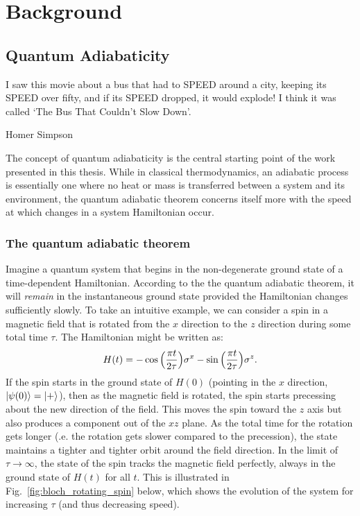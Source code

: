 \part{Background}
\chapter{Quantum Adiabaticity}

\epigraph{I saw this movie about a bus that had to SPEED around a city, keeping its SPEED over fifty, and if its SPEED dropped, it would explode! I think it was called `The Bus That Couldn’t Slow Down'.}{Homer Simpson}

    
The concept of quantum adiabaticity is the central starting point of the work presented in this thesis. While in classical thermodynamics, an adiabatic process is essentially one where no heat or mass is transferred between a system and its environment, the quantum adiabatic theorem concerns itself more with the speed at which changes in a system Hamiltonian occur. 
        
    \section{The quantum adiabatic theorem}
    
    Imagine a quantum system that begins in the non-degenerate ground state of a time-dependent Hamiltonian. According to the the quantum adiabatic theorem, it will \emph{remain} in the instantaneous ground state provided the Hamiltonian changes sufficiently slowly. To take an intuitive example, we can consider a spin in a magnetic field that is rotated from the $x$ direction to the $z$ direction during some total time $\tau$. The Hamiltonian might be written as:
    \begin{equation}\label{eq:rotating_spin_H}
        H(t) = -\cos\Big(\frac{\pi t}{2 \tau}\Big)\sigma^x - \sin \Big(\frac{\pi t}{2 \tau}\Big)\sigma^z.
    \end{equation}
    If the spin starts in the ground state of $H(0)$ (pointing in the $x$ direction, $\ket{\psi(0)} = \ket{+}$), then as the magnetic field is rotated, the spin starts precessing about the new direction of the field. This moves the spin toward the $z$ axis but also produces a component out of the $xz$ plane. As the total time for the rotation gets longer (\@i.e. the rotation gets slower compared to the precession), the state maintains a tighter and tighter orbit around the field direction. In the limit of $\tau \rightarrow \infty$, the state of the spin tracks the magnetic field perfectly, always in the ground state of $H(t)$ for all $t$. This is illustrated in Fig.~\ref{fig:bloch_rotating_spin} below, which shows the evolution of the system for increasing $\tau$ (and thus decreasing speed).
    
